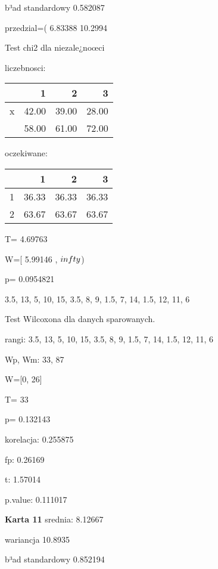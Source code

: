 \documentclass[a4paper,12pt]{article}
\begin{document}
\begin{multicols}{3}
     b³ad standardowy 0.582087 
     
     przedzial=( 6.83388 10.2994 \vspace{1cm} 

  Test chi2 dla niezale¿noœci 
   
   liczebnosci: %
\begin{tabular}{rrrr}
  \hline
 & 1 & 2 & 3 \\
  \hline
x & 42.00 & 39.00 & 28.00 \\
   & 58.00 & 61.00 & 72.00 \\
   \hline
\end{tabular}
 
   
   oczekiwane: %
\begin{tabular}{rrrr}
  \hline
 & 1 & 2 & 3 \\
  \hline
1 & 36.33 & 36.33 & 36.33 \\
  2 & 63.67 & 63.67 & 63.67 \\
   \hline
\end{tabular}
 
   
   T= 4.69763 
   
   W=[ 5.99146 , $\\infty$) 
   
   p= 0.0954821 \vspace{1cm} 

  3.5, 13, 5, 10, 15, 3.5, 8, 9, 1.5, 7, 14, 1.5, 12, 11, 6 

  Test Wilcoxona dla danych sparowanych. 
  
  rangi: 3.5, 13, 5, 10, 15, 3.5, 8, 9, 1.5, 7, 14, 1.5, 12, 11, 6 
  
  Wp, Wm:  33,  87 
  
  W=[0, 26]  
  
  T=  33 
  
  p= 0.132143 \vspace{1cm} 

  korelacja: 0.255875
     
     fp: 0.26169
     
     t: 1.57014
     
     p.value: 0.111017 \vspace{1cm} 

  \textbf{Karta  11 } 
 srednia: 8.12667 
     
     wariancja 10.8935  
     
     b³ad standardowy 0.852194 
     

\end{multicols}
\end{document}
